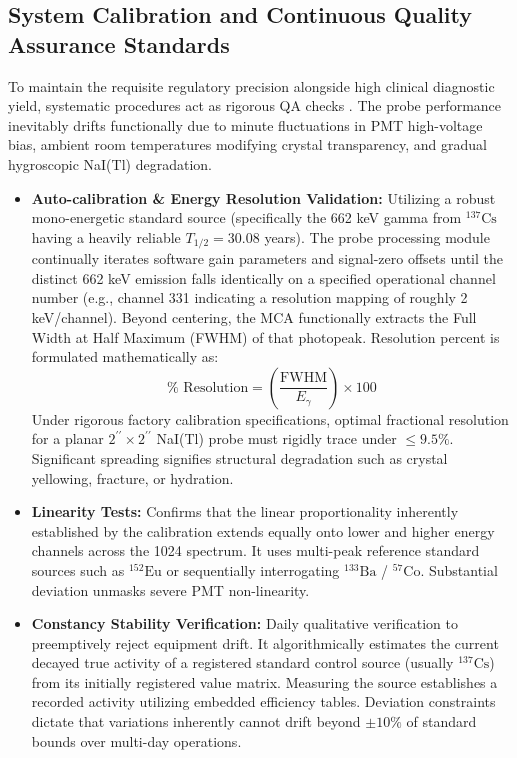\subsection{System Calibration and Continuous Quality Assurance Standards}
To maintain the requisite regulatory precision alongside high clinical diagnostic yield, systematic procedures act as rigorous QA checks \cite{captus4000e}. The probe performance inevitably drifts functionally due to minute fluctuations in PMT high-voltage bias, ambient room temperatures modifying crystal transparency, and gradual hygroscopic NaI(Tl) degradation.

\begin{itemize}
    \item \textbf{Auto-calibration \& Energy Resolution Validation:} Utilizing a robust mono-energetic standard source (specifically the 662 keV gamma from $^{137}\text{Cs}$ having a heavily reliable $T_{1/2} = 30.08$ years). The probe processing module continually iterates software gain parameters and signal-zero offsets until the distinct 662 keV emission falls identically on a specified operational channel number (e.g., channel 331 indicating a resolution mapping of roughly 2 keV/channel). Beyond centering, the MCA functionally extracts the Full Width at Half Maximum (FWHM) of that photopeak. Resolution percent is formulated mathematically as:
    \begin{equation}
        \% \text{ Resolution} = \left( \frac{\text{FWHM}}{E_\gamma} \right) \times 100
    \end{equation}
    Under rigorous factory calibration specifications, optimal fractional resolution for a planar $2^{\prime\prime}\times2^{\prime\prime}$ NaI(Tl) probe must rigidly trace under $\leq 9.5\%$. Significant spreading signifies structural degradation such as crystal yellowing, fracture, or hydration.

    \item \textbf{Linearity Tests:} Confirms that the linear proportionality inherently established by the calibration extends equally onto lower and higher energy channels across the 1024 spectrum. It uses multi-peak reference standard sources such as $^{152}\text{Eu}$ or sequentially interrogating $^{133}\text{Ba}$ / $^{57}\text{Co}$. Substantial deviation unmasks severe PMT non-linearity.

    \item \textbf{Constancy Stability Verification:} Daily qualitative verification to preemptively reject equipment drift. It algorithmically estimates the current decayed true activity of a registered standard control source (usually $^{137}\text{Cs}$) from its initially registered value matrix. Measuring the source establishes a recorded activity utilizing embedded efficiency tables. Deviation constraints dictate that variations inherently cannot drift beyond $\pm 10\%$ of standard bounds over multi-day operations.


\end{itemize}
